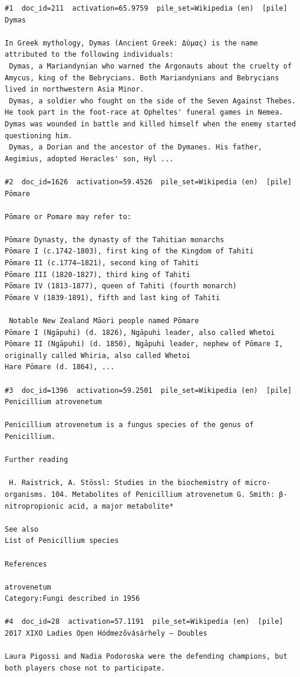 \begin{verbatim}
#1  doc_id=211  activation=65.9759  pile_set=Wikipedia (en)  [pile]
Dymas

In Greek mythology, Dymas (Ancient Greek: Δύμας) is the name attributed to the following individuals:
 Dymas, a Mariandynian who warned the Argonauts about the cruelty of Amycus, king of the Bebrycians. Both Mariandynians and Bebrycians lived in northwestern Asia Minor.
 Dymas, a soldier who fought on the side of the Seven Against Thebes. He took part in the foot-race at Opheltes' funeral games in Nemea. Dymas was wounded in battle and killed himself when the enemy started questioning him.
 Dymas, a Dorian and the ancestor of the Dymanes. His father, Aegimius, adopted Heracles' son, Hyl ...

#2  doc_id=1626  activation=59.4526  pile_set=Wikipedia (en)  [pile]
Pōmare

Pōmare or Pomare may refer to:

Pōmare Dynasty, the dynasty of the Tahitian monarchs
Pōmare I (c.1742-1803), first king of the Kingdom of Tahiti
Pōmare II (c.1774–1821), second king of Tahiti
Pōmare III (1820-1827), third king of Tahiti
Pōmare IV (1813-1877), queen of Tahiti (fourth monarch)
Pōmare V (1839-1891), fifth and last king of Tahiti

 Notable New Zealand Māori people named Pōmare
Pōmare I (Ngāpuhi) (d. 1826), Ngāpuhi leader, also called Whetoi
Pōmare II (Ngāpuhi) (d. 1850), Ngāpuhi leader, nephew of Pōmare I, originally called Whiria, also called Whetoi
Hare Pōmare (d. 1864), ...

#3  doc_id=1396  activation=59.2501  pile_set=Wikipedia (en)  [pile]
Penicillium atrovenetum

Penicillium atrovenetum is a fungus species of the genus of Penicillium.

Further reading

 H. Raistrick, A. Stössl: Studies in the biochemistry of micro-organisms. 104. Metabolites of Penicillium atrovenetum G. Smith: β-nitropropionic acid, a major metabolite*

See also
List of Penicillium species

References

atrovenetum
Category:Fungi described in 1956

#4  doc_id=28  activation=57.1191  pile_set=Wikipedia (en)  [pile]
2017 XIXO Ladies Open Hódmezővásárhely – Doubles

Laura Pigossi and Nadia Podoroska were the defending champions, but both players chose not to participate.


\end{verbatim}

